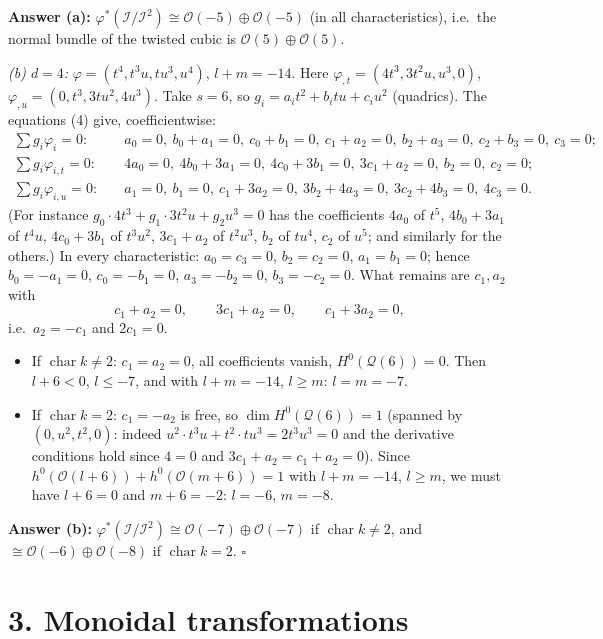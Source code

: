 \documentclass[11pt]{article}
\begin{document}
\textbf{Answer (a):} $\varphi^*(\mathcal I/\mathcal I^2)\cong\mathcal O(-5)\oplus\mathcal O(-5)$ (in all characteristics), i.e.\ the normal bundle of the twisted cubic is $\mathcal O(5)\oplus\mathcal O(5)$.

\emph{(b) $d=4$:} $\varphi=(t^4,t^3u,tu^3,u^4)$, $l+m=-14$. Here $\varphi_{,t}=(4t^3,3t^2u,u^3,0)$, $\varphi_{,u}=(0,t^3,3tu^2,4u^3)$. Take $s=6$, so $g_i=a_it^2+b_itu+c_iu^2$ (quadrics). The equations (4) give, coefficientwise:
\begin{align*}
\textstyle\sum g_i\varphi_i=0:&\quad a_0=0,\ b_0+a_1=0,\ c_0+b_1=0,\ c_1+a_2=0,\ b_2+a_3=0,\ c_2+b_3=0,\ c_3=0;\\
\textstyle\sum g_i\varphi_{i,t}=0:&\quad 4a_0=0,\ 4b_0+3a_1=0,\ 4c_0+3b_1=0,\ 3c_1+a_2=0,\ b_2=0,\ c_2=0;\\
\textstyle\sum g_i\varphi_{i,u}=0:&\quad a_1=0,\ b_1=0,\ c_1+3a_2=0,\ 3b_2+4a_3=0,\ 3c_2+4b_3=0,\ 4c_3=0 .
\end{align*}
(For instance $g_0\cdot4t^3+g_1\cdot3t^2u+g_2u^3=0$ has the coefficients $4a_0$ of $t^5$, $4b_0+3a_1$ of $t^4u$, $4c_0+3b_1$ of $t^3u^2$, $3c_1+a_2$ of $t^2u^3$, $b_2$ of $tu^4$, $c_2$ of $u^5$; and similarly for the others.) In every characteristic: $a_0=c_3=0$, $b_2=c_2=0$, $a_1=b_1=0$; hence $b_0=-a_1=0$, $c_0=-b_1=0$, $a_3=-b_2=0$, $b_3=-c_2=0$. What remains are $c_1,a_2$ with
\[ c_1+a_2=0,\qquad 3c_1+a_2=0,\qquad c_1+3a_2=0, \]
i.e.\ $a_2=-c_1$ and $2c_1=0$.
\begin{itemize}
\item If $\operatorname{char}k\ne2$: $c_1=a_2=0$, all coefficients vanish, $H^0(\mathcal Q(6))=0$. Then $l+6<0$, $l\le-7$, and with $l+m=-14$, $l\ge m$: $l=m=-7$.
\item If $\operatorname{char}k=2$: $c_1=-a_2$ is free, so $\dim H^0(\mathcal Q(6))=1$ (spanned by $(0,u^2,t^2,0)$: indeed $u^2\cdot t^3u+t^2\cdot tu^3=2t^3u^3=0$ and the derivative conditions hold since $4=0$ and $3c_1+a_2=c_1+a_2=0$). Since $h^0(\mathcal O(l+6))+h^0(\mathcal O(m+6))=1$ with $l+m=-14$, $l\ge m$, we must have $l+6=0$ and $m+6=-2$: $l=-6$, $m=-8$.
\end{itemize}
\textbf{Answer (b):} $\varphi^*(\mathcal I/\mathcal I^2)\cong\mathcal O(-7)\oplus\mathcal O(-7)$ if $\operatorname{char}k\ne2$, and $\cong\mathcal O(-6)\oplus\mathcal O(-8)$ if $\operatorname{char}k=2$. \hfill$\square$

\section*{3. Monoidal transformations}
\end{document}
